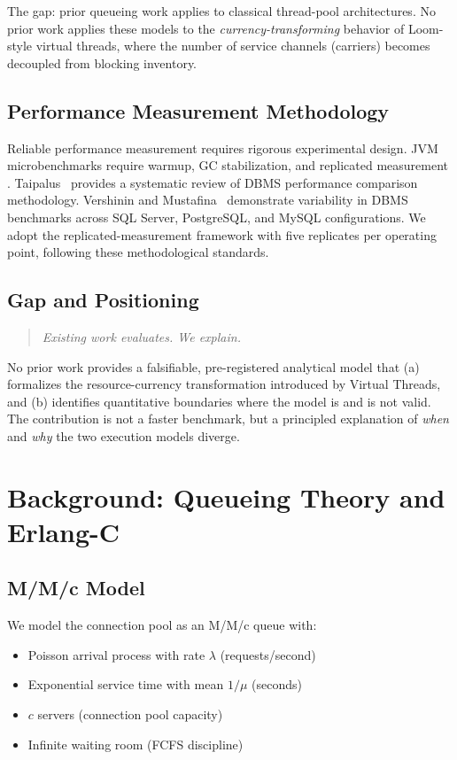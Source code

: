 \documentclass[10pt]{article}
\begin{document}
The gap: prior queueing work applies to classical thread-pool architectures. No prior work applies these models to the \emph{currency-transforming} behavior of Loom-style virtual threads, where the number of service channels (carriers) becomes decoupled from blocking inventory.

\subsection{Performance Measurement Methodology}

Reliable performance measurement requires rigorous experimental design. JVM microbenchmarks require warmup, GC stabilization, and replicated measurement \cite{yang2018}. Taipalus~\cite{taipalus2022} provides a systematic review of DBMS performance comparison methodology. Vershinin and Mustafina~\cite{vershinin2021} demonstrate variability in DBMS benchmarks across SQL Server, PostgreSQL, and MySQL configurations. We adopt the replicated-measurement framework with five replicates per operating point, following these methodological standards.

\subsection{Gap and Positioning}

\begin{quote}
\itshape Existing work evaluates. We explain.
\end{quote}

No prior work provides a falsifiable, pre-registered analytical model that (a) formalizes the resource-currency transformation introduced by Virtual Threads, and (b) identifies quantitative boundaries where the model is and is not valid. The contribution is not a faster benchmark, but a principled explanation of \emph{when} and \emph{why} the two execution models diverge.

\section{Background: Queueing Theory and Erlang-C}

\subsection{M/M/c Model}

We model the connection pool as an M/M/c queue with:
\begin{itemize}
\item Poisson arrival process with rate $\lambda$ (requests/second)
\item Exponential service time with mean $1/\mu$ (seconds)
\item $c$ servers (connection pool capacity)
\item Infinite waiting room (FCFS discipline)
\end{itemize}
\end{document}
